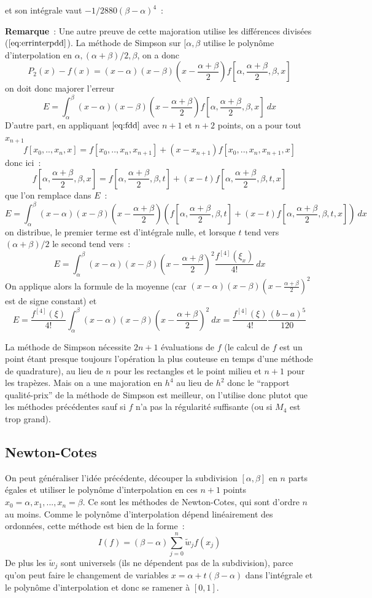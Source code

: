 \documentclass[a4paper,11pt]{article}
\begin{document}
\begin{giacjshere}
et son int\'egrale vaut $-1/2880(\beta-\alpha)^4$~:\\

{\bf Remarque}~: Une autre preuve de cette majoration utilise les
diff\'erences divis\'ees (\(\ref{eq:errinterpdd}\)).
La m\'ethode de Simpson sur $[\alpha,\beta$ 
utilise le polyn\^ome d'interpolation en 
$\alpha, (\alpha+\beta)/2, \beta$, on a donc
$$ P_2(x)-f(x)=(x-\alpha)(x-\beta) (x-\frac{\alpha+\beta}{2})
f[\alpha,\frac{\alpha+\beta}{2},\beta,x]$$
on doit donc majorer l'erreur
$$ E=\int_\alpha^\beta (x-\alpha)(x-\beta) (x-\frac{\alpha+\beta}{2})
f[\alpha,\frac{\alpha+\beta}{2},\beta,x] \ dx $$
D'autre part, en appliquant \(\ref{eq:fdd}\) avec $n+1$ et $n+2$ points, on a
pour tout $x_{n+1}$
$$ f[x_0,..,x_n,x]=f[x_0,..,x_n,x_{n+1}]+(x-x_{n+1})f[x_0,..,x_n,x_{n+1},x]$$
donc ici~:
$$ f[\alpha,\frac{\alpha+\beta}{2},\beta,x]=f[\alpha,\frac{\alpha+\beta}{2},\beta,t]+(x-t)f[\alpha,\frac{\alpha+\beta}{2},\beta,t,x]$$
que l'on remplace dans $E$~:
$$ E=\int_\alpha^\beta (x-\alpha)(x-\beta) (x-\frac{\alpha+\beta}{2})
(f[\alpha,\frac{\alpha+\beta}{2},\beta,t]
+(x-t)
f[\alpha,\frac{\alpha+\beta}{2},\beta,t,x]) \ dx$$
on distribue, le premier terme est d'int\'egrale nulle,
et lorsque $t$ tend vers $(\alpha+\beta)/2$ le second
tend vers~:
$$ E=\int_\alpha^\beta (x-\alpha)(x-\beta) (x-\frac{\alpha+\beta}{2})^2 
\frac{f^{[4]}(\xi_x)}{4!} \ dx$$
On applique alors la formule de la moyenne 
(car $(x-\alpha)(x-\beta) (x-\frac{\alpha+\beta}{2})^2$ est de signe constant)
et
$$ E=\frac{f^{[4]}(\xi)}{4!} 
\int_\alpha^\beta (x-\alpha)(x-\beta) (x-\frac{\alpha+\beta}{2})^2 \ dx
= \frac{f^{[4]}(\xi)}{4!} \frac{(b-a)^5}{120}$$

La m\'ethode de Simpson n\'ecessite $2n+1$ \'evaluations de $f$ (le calcul
de $f$ est un point \'etant presque toujours 
l'op\'eration la plus couteuse en temps d'une
m\'ethode de quadrature), au lieu de $n$ pour les rectangles
et le point milieu et $n+1$ pour les trap\`ezes. Mais on a une majoration
en $h^4$ au lieu de $h^2$ donc le ``rapport qualit\'e-prix'' de la m\'ethode
de Simpson est meilleur, on l'utilise donc plutot que les
m\'ethodes pr\'ec\'edentes sauf si $f$ n'a pas la r\'egularit\'e
suffisante (ou si $M_4$ est trop grand).

 \subsection{Newton-Cotes} 
On peut g\'en\'eraliser l'id\'ee pr\'ec\'edente, d\'ecouper la subdivision 
$[\alpha,\beta]$ en $n$ parts \'egales et utiliser le polynôme d'interpolation
en ces $n+1$ points $x_0=\alpha, x_1, ..., x_n=\beta$. 
Ce sont les m\'ethodes de Newton-Cotes,
qui sont d'ordre $n$ au moins. Comme le polyn\^ome d'interpolation
d\'epend lin\'eairement des ordonn\'ees, cette m\'ethode est bien
de la forme~:
\[ I(f)=(\beta-\alpha)\sum_{j=0}^n \tilde{w}_j f(x_j)\]
De plus les $\tilde{w}_j$ sont universels (ils ne d\'ependent pas de 
la subdivision), parce qu'on peut faire 
le changement de variables $x=\alpha+t(\beta-\alpha)$ dans l'int\'egrale
et le polyn\^ome d'interpolation et donc se ramener \`a $[0,1]$.


\end{giacjshere}
\end{document}
